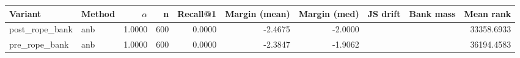 \begin{tabular}{l l r r r r r r r r}
\toprule
Variant & Method & $\alpha$ & n & Recall@1 & Margin (mean) & Margin (med) & JS drift & Bank mass & Mean rank \\
\midrule
post\_rope\_bank & anb & 1.0000 & 600 & 0.0000 & -2.4675 & -2.0000 &  &  & 33358.6933 \\
pre\_rope\_bank & anb & 1.0000 & 600 & 0.0000 & -2.3847 & -1.9062 &  &  & 36194.4583 \\
\bottomrule
\end{tabular}
